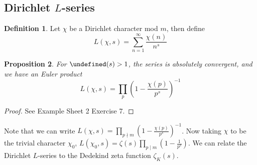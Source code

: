 \documentclass[11pt]{article}
\theoremstyle{definition}
\newtheorem{definition}{Definition}[section]
\theoremstyle{plain}
\newtheorem{proposition}[definition]{Proposition}
\theoremstyle{remark}
\let\Re\undefined
\DeclareMathOperator{\Re}{Re}
\begin{document}
\subsection{Dirichlet \texorpdfstring{$L$}{L}-series}

\begin{definition}\label{def:7_15}
    Let $\chi$ be a Dirichlet character mod $m$, then define
    \begin{equation*}
        L(\chi, s) = \sum_{n=1}^\infty \frac{\chi(n)}{n^s}
    \end{equation*}
\end{definition}

\begin{proposition}\label{prop:7_16}
    For $\Re(s) > 1$, the series is absolutely convergent, and we have an Euler product
    \begin{equation*}
        L(\chi, s) = \prod_p \left(1 - \frac{\chi(p)}{p^s}\right)^{-1}
    \end{equation*}
\end{proposition}
\begin{proof}
    See Example Sheet 2 Exercise 7.
\end{proof}

Note that we can write $L(\chi,s) = \prod_{p \nmid m} \left(1 - \frac{\chi(p)}{p^s}\right)^{-1}$. Now taking $\chi$ to be the trivial character $\chi_0$, $L(\chi_0,s) = \zeta(s) \prod_{p \mid m} \left(1 - \frac{1}{p^s}\right)$. We can relate the Dirichlet $L$-series to the Dedekind zeta function $\zeta_K(s)$.
\end{document}
